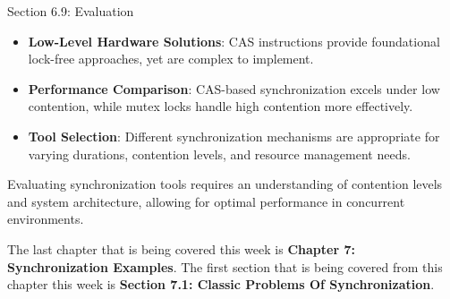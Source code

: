 \begin{notes}{Section 6.9: Evaluation}
\begin{highlight}
    \end{highlight}
    
    \begin{highlight}
    
        \begin{itemize}
            \item \textbf{Low-Level Hardware Solutions}: CAS instructions provide foundational lock-free approaches, yet are complex to implement.
            \item \textbf{Performance Comparison}: CAS-based synchronization excels under low contention, while mutex locks handle high contention more effectively.
            \item \textbf{Tool Selection}: Different synchronization mechanisms are appropriate for varying durations, contention levels, and resource management needs.
        \end{itemize}
    
    Evaluating synchronization tools requires an understanding of contention levels and system architecture, allowing for optimal performance in concurrent environments.
    
    \end{highlight}
\end{notes}

The last chapter that is being covered this week is \textbf{Chapter 7: Synchronization Examples}. The first section that is being covered from this chapter this week is \textbf{Section 7.1: Classic Problems Of Synchronization}.

